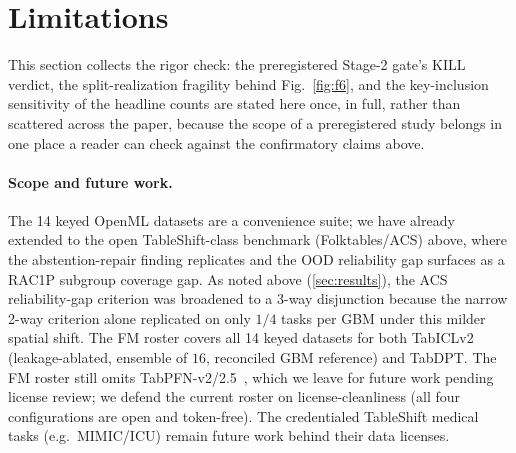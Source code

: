 \documentclass[pdflatex,sn-mathphys-num]{sn-jnl}
\begin{document}
\section{Limitations}\label{sec:limitations}
This section collects the rigor check: the preregistered Stage-2 gate's KILL verdict, the
split-realization fragility behind Fig.~\ref{fig:f6}, and the key-inclusion sensitivity of the headline
counts are stated here once, in full, rather than scattered across the paper, because the scope of a
preregistered study belongs in one place a reader can check against the confirmatory claims above.
\paragraph{Scope and future work.} The 14 keyed OpenML datasets are a convenience suite; we have already
extended to the open TableShift-class benchmark (Folktables/ACS) above, where the abstention-repair finding
replicates and the OOD reliability gap surfaces as a RAC1P subgroup coverage gap. As noted above
(\cref{sec:results}), the ACS reliability-gap criterion was broadened to a 3-way disjunction because the
narrow 2-way criterion alone replicated on only $1/4$ tasks per GBM under this milder spatial shift.
The FM roster covers all 14 keyed datasets for both TabICLv2 (leakage-ablated, ensemble of $16$,
reconciled GBM reference) and TabDPT. The
FM roster still omits TabPFN-v2/2.5~\citep{hollmann2025tabpfn,tabpfn25_2025}, which we leave
for future work pending license review; we defend the current roster on license-cleanliness (all four configurations are open and
token-free).
The credentialed TableShift medical tasks (e.g.\ MIMIC/ICU) remain future work behind their
data licenses.
\end{document}
